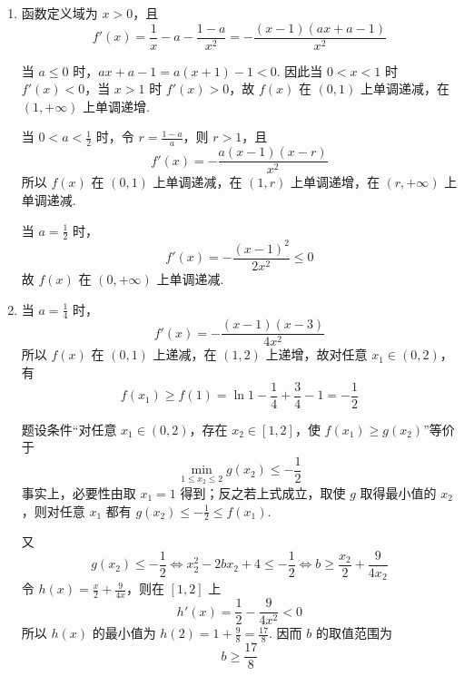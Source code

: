 \begin{solution}
\begin{enumerate}
\item 函数定义域为 \(x>0\)，且
\[
f'(x)=\frac1x-a-\frac{1-a}{x^2}=-\frac{(x-1)(ax+a-1)}{x^2}
\]

当 \(a\leqslant0\) 时，\(ax+a-1=a(x+1)-1<0\). 因此当 \(0<x<1\) 时 \(f'(x)<0\)，当 \(x>1\) 时 \(f'(x)>0\)，故 \(f(x)\) 在 \((0,1)\) 上单调递减，在 \((1,+\infty)\) 上单调递增.

当 \(0<a<\frac12\) 时，令 \(r=\frac{1-a}{a}\)，则 \(r>1\)，且
\[
f'(x)=-\frac{a(x-1)(x-r)}{x^2}
\]
所以 \(f(x)\) 在 \((0,1)\) 上单调递减，在 \((1,r)\) 上单调递增，在 \((r,+\infty)\) 上单调递减.

当 \(a=\frac12\) 时，
\[
f'(x)=-\frac{(x-1)^2}{2x^2}\leqslant0
\]
故 \(f(x)\) 在 \((0,+\infty)\) 上单调递减.
\item 当 \(a=\frac14\) 时，
\[
f'(x)=-\frac{(x-1)(x-3)}{4x^2}
\]
所以 \(f(x)\) 在 \((0,1)\) 上递减，在 \((1,2)\) 上递增，故对任意 \(x_1\in(0,2)\)，有
\[
f(x_1)\geqslant f(1)=\ln1-\frac14+\frac34-1=-\frac12
\]

题设条件“对任意 \(x_1\in(0,2)\)，存在 \(x_2\in[1,2]\)，使 \(f(x_1)\geqslant g(x_2)\)”等价于
\[
\min_{1\leqslant x_2\leqslant2}g(x_2)\leqslant-\frac12
\]
事实上，必要性由取 \(x_1=1\) 得到；反之若上式成立，取使 \(g\) 取得最小值的 \(x_2\)，则对任意 \(x_1\) 都有 \(g(x_2)\leqslant-\frac12\leqslant f(x_1)\).

又
\[
g(x_2)\leqslant-\frac12\iff x_2^2-2bx_2+4\leqslant-\frac12\iff b\geqslant \frac{x_2}{2}+\frac{9}{4x_2}
\]
令 \(h(x)=\frac{x}{2}+\frac{9}{4x}\)，则在 \([1,2]\) 上
\[
h'(x)=\frac12-\frac{9}{4x^2}<0
\]
所以 \(h(x)\) 的最小值为 \(h(2)=1+\frac98=\frac{17}{8}\). 因而 \(b\) 的取值范围为
\[
b\geqslant\frac{17}{8}
\]
\end{enumerate}
\end{solution}
